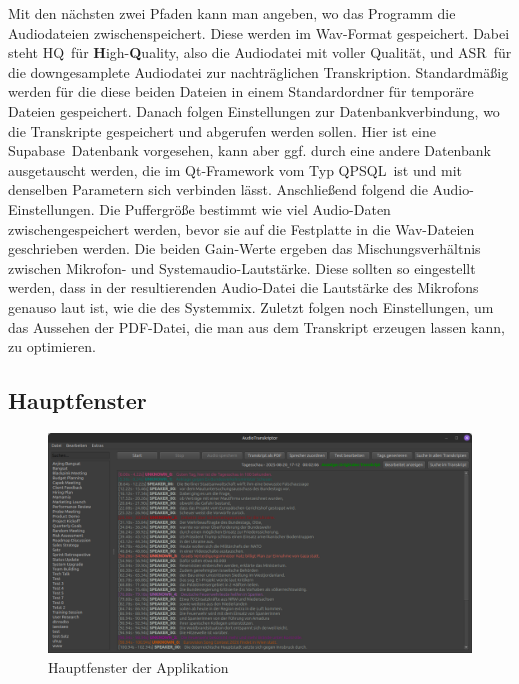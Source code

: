 Mit den nächsten zwei Pfaden kann man angeben, wo das Programm die Audiodateien zwischenspeichert. Diese werden im Wav-Format gespeichert. Dabei steht \glqq HQ\grqq\ für \textbf{H}igh-\textbf{Q}uality, also die Audiodatei mit voller Qualität, und \glqq ASR\grqq\ für die downgesamplete Audiodatei zur nachträglichen Transkription. Standardmäßig werden für die diese beiden Dateien in einem Standardordner für temporäre Dateien gespeichert. Danach folgen Einstellungen zur Datenbankverbindung, wo die Transkripte gespeichert und abgerufen werden sollen. Hier ist eine \glqq Supabase\grqq\ Datenbank vorgesehen, kann aber ggf. durch eine andere Datenbank ausgetauscht werden, die im Qt-Framework vom Typ \glqq QPSQL\grqq\ ist und mit denselben Parametern sich verbinden lässt. Anschließend folgend die Audio-Einstellungen. Die Puffergröße bestimmt wie viel Audio-Daten zwischengespeichert werden, bevor sie auf die Festplatte in die Wav-Dateien geschrieben werden. Die beiden Gain-Werte ergeben das Mischungsverhältnis zwischen Mikrofon- und Systemaudio-Lautstärke. Diese sollten so eingestellt werden, dass in der resultierenden Audio-Datei die Lautstärke des Mikrofons genauso laut ist, wie die des Systemmix. Zuletzt folgen noch Einstellungen, um das Aussehen der PDF-Datei, die man aus dem Transkript erzeugen lassen kann, zu optimieren.


\subsection{Hauptfenster}
\label{sub:main}

\begin{figure}
    \centering
    \includegraphics[width=0.7\linewidth]{Bilder/Applikation}
    \caption[Hauptfenster]{Hauptfenster der Applikation}
    \label{pic:App}
\end{figure}

